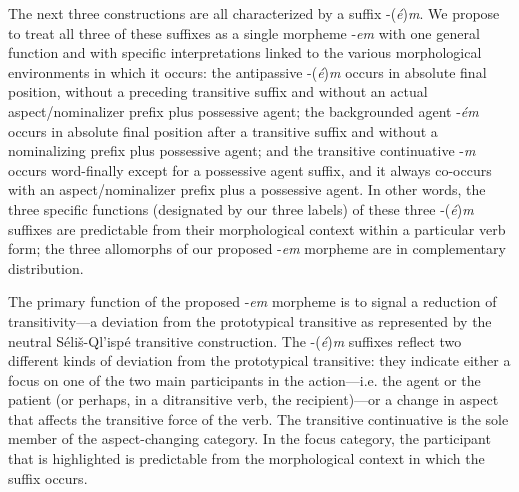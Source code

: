 \documentclass[output=paper,colorlinks,citecolor=brown]{langscibook}
\begin{document}
The next three constructions are all characterized by a suffix
-(\emph{\'e})\emph{m}.  We propose to treat all three of these
suffixes as a single morpheme -\emph{em} with one general function and
with specific interpretations linked to the various morphological
environments in which it occurs: the antipassive -(\emph{\'e})\emph{m}
occurs in absolute final position, without a preceding transitive
suffix and without an actual aspect/nominalizer prefix plus possessive
agent; the backgrounded agent -\emph{\'em} occurs in absolute final
position after a transitive suffix and without a nominalizing prefix
plus possessive agent; and the transitive continuative -\emph{m}
occurs word-finally except for a possessive agent suffix, and it
always co-occurs with an aspect/nominalizer prefix plus a possessive
agent.  In other words, the three specific functions (designated by
our three labels) of these three -(\emph{\'e})\emph{m}  suffixes are
 predictable from their morphological context within a particular
 verb form; the three allomorphs of our proposed -\emph{em}
 morpheme are in complementary distribution.


The primary function of the proposed -\emph{em} morpheme is to signal
a reduction of transitivity---a deviation from the prototypical
transitive as represented by the neutral S\'eli\v{s}-Ql'isp\'e
transitive construction.  The -({\em \'e}){\em m} suffixes reflect two
different kinds of deviation from the prototypical transitive: they
indicate either a focus on one of the two main participants in the
action---i.e. the agent or the patient (or perhaps, in a
ditransitive verb, the recipient)---or a change in aspect that
affects the transitive force of the verb.  The transitive continuative
is the sole member of the aspect-changing category.  In the focus
category, the participant that is highlighted is predictable from the
morphological context in which the suffix occurs.
\end{document}
